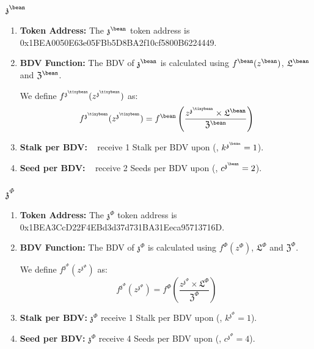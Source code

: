 \documentclass[class=article, crop=false]{standalone}
\begin{document}
\subsubsection{$\mathfrak{z}^{\bean}$}
    \begin{enumerate}
        \item \textbf{Token Address:} The $\mathfrak{z}^{\bean}$ token address is 0x1BEA0050E63e05FBb5D8BA2f10cf5800B6224449.
        \item \textbf{BDV Function:} The BDV of $\mathfrak{z}^{\bean}$ is calculated using $f^{\bean}(z^{\bean})$, $\mathfrak{L}^{\bean}$ and $\mathfrak{Z}^{\bean}$. 
        
We define $f^{\mathfrak{z}^{\tinybean}}(z^{\mathfrak{z}^{\tinybean}})$ as:
            $$f^{\mathfrak{z}^{\tinybean}}(z^{\mathfrak{z}^{\tinybean}}) = f^{\bean}\left(\frac{z^{\mathfrak{z}^{\tinybean}} \times \mathfrak{L}^{\bean}}{\mathfrak{Z}^{\bean}}\right)$$
        \item \textbf{Stalk per BDV:} \Bean\  receive 1 Stalk per BDV upon  (, $k^{\mathfrak{z}^{\bean}} = 1$).
        \item \textbf{Seed per BDV:} \Bean\  receive 2 Seeds per BDV upon  (, $c^{\mathfrak{z}^{\bean}} = 2$).
    \end{enumerate}
\subsubsection{$\mathfrak{z}^{\Phi}$}
    \begin{enumerate}
        \item \textbf{Token Address:} The $\mathfrak{z}^{\Phi}$ token address is 0x1BEA3CcD22F4EBd3d37d731BA31Eeca95713716D.
        \item \textbf{BDV Function:} The BDV of $\mathfrak{z}^{\Phi}$ is calculated using $f^{\Phi}(z^{\Phi})$, $\mathfrak{L}^{\Phi}$ and $\mathfrak{Z}^{\Phi}$. 
        
We define $f^{\mathfrak{z}^{\Phi}}(z^{\mathfrak{z}^{\Phi}})$ as:
            $$f^{\mathfrak{z}^{\Phi}}(z^{\mathfrak{z}^{\Phi}}) = f^{\Phi}\left(\frac{z^{\mathfrak{z}^{\Phi}} \times \mathfrak{L}^{\Phi}}{\mathfrak{Z}^{\Phi}}\right)$$
        \item \textbf{Stalk per BDV:} $\mathfrak{z}^{\Phi}$  receive 1 Stalk per BDV upon  (, $k^{\mathfrak{z}^{\Phi}} = 1$).
        \item \textbf{Seed per BDV:} $\mathfrak{z}^{\Phi}$  receive 4 Seeds per BDV upon  (, $c^{\mathfrak{z}^{\Phi}} = 4$).
    \end{enumerate}
\end{document}
